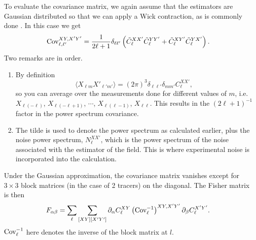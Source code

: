 \documentclass[11pt]{article} %
\DeclareRobustCommand{\Cov}{\ifmmode\text{Cov}\else d\fi}
\newcommand{\br}[1]{\ensuremath{\left( #1 \right)}}
\begin{document}
To evaluate the covariance matrix, we again assume that the estimators are Gaussian distributed so that we can apply a Wick contraction, as is commonly done \cite{tegmark1997cosmic}. In this case we get
\begin{equation*}
    \Cov^{XY, X'Y'}_{\ell, \ell'} = \frac{1}{2\ell+1}\delta_{\ell \ell'}\br{\tilde C^{XX'}_\ell \tilde C^{YY'}_\ell + \tilde C^{XY'}_\ell \tilde C^{YX'}_\ell}.
\end{equation*}
Two remarks are in order.
\begin{enumerate}
    \item By definition
    \begin{equation*}
        \langle X_{\ell m}X'_{\ell'm'} \rangle = (2\pi)^3 \delta_{\ell\ell'}\delta_{mm'}C_\ell^{XX'},
    \end{equation*}
    so you can average over the measurements done for different values of $m$, i.e. $X_{\ell(-\ell)}$, $X_{\ell(-\ell+1)}$, $\cdots$, $X_{\ell(\ell-1)}$, $X_{\ell \ell}$. This results in the $(2\ell+1)^{-1}$ factor in the power spectrum covariance. 
    \item The tilde is used to denote the power spectrum as calculated earlier, plus the noise power spectrum, $N^{XX'}_\ell$, which is the power spectrum of the noise associated with the estimator of the field. This is where experimental noise is incorporated into the calculation. 
\end{enumerate}
Under the Gaussian approximation, the covariance matrix vanishes except for $3\times 3$ block matrices (in the case of 2 tracers) on the diagonal. The Fisher matrix is then
\begin{equation*}
    F_{\alpha\beta} = \sum_{\ell}\sum_{[XY][X'Y']} \partial_\alpha C_{\ell}^{XY} \br{\Cov^{-1}_\ell}^{XY, X'Y'} \partial_\beta C^{X'Y'}_{\ell}.
\end{equation*} 
$\Cov^{-1}_\ell$ here denotes the inverse of the block matrix at $l$.
\end{document}
